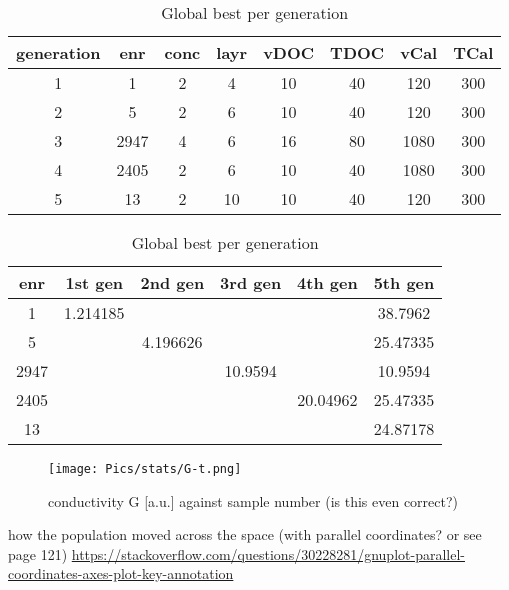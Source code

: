 \begin{table}[htb]
	\centering
    \caption{Global best per generation}
	\label{tab:emma-Gb}
	\begin{tabular}{cccccccc}
        \hline\hline
    generation  &enr &conc &layr &vDOC &TDOC &vCal &TCal\\
        \hline
     1   &1       &2    &4   &10   &40  &120  &300\\
     2   &5       &2    &6   &10   &40  &120  &300\\
     3   &2947    &4    &6   &16   &80 &1080  &300\\
     4   &2405    &2    &6   &10   &40 &1080  &300\\
     5   &13      &2   &10   &10   &40  &120  &300\\
    \hline\hline
	\end{tabular}
\begin{tabular}{cccccc}
    \hline\hline
enr     &1st gen     &2nd gen        &3rd gen        &4th gen        &5th gen\\
    \hline
1       &1.214185    &       &       &       &38.7962       \\
5       &       &4.196626       &       &       &25.47335       \\
2947    &       &       &10.9594    &       &10.9594       \\
2405    &       &       &       &20.04962   &25.47335       \\
13      &       &       &       &       &24.87178   \\
    \hline\hline
\end{tabular}
\end{table}


\begin{figure}
\centering
\texttt{[image: Pics/stats/G-t.png]}
    \caption{conductivity G [a.u.] against sample number (is this even correct?)}
    \label{fig:G-t}
\end{figure}

 how the population moved across the space (with parallel coordinates? or see page 121)
\url{https://stackoverflow.com/questions/30228281/gnuplot-parallel-coordinates-axes-plot-key-annotation}

